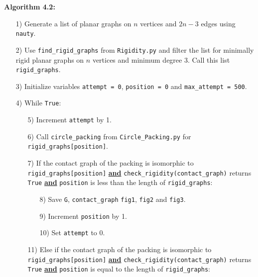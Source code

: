 \begin{flushleft}
\textbf{Algorithm 4.2:}
\begin{enumerate}
    \item[1)] Generate a list of planar graphs on $n$ vertices and $2n-3$ edges using \texttt{nauty}.
    \vspace{-3mm}
    \item[2)] Use \texttt{find\_rigid\_graphs} from \texttt{Rigidity.py} and filter the list for minimally rigid planar graphs on $n$ vertices and minimum degree 3. Call this list \texttt{rigid\_graphs}.
    \vspace{-3mm}
    \item[3)] Initialize variables \texttt{attempt = 0}, \texttt{position = 0} and \texttt{max\_attempt = 500}.
    \vspace{-3mm}
    \item[4)] While \texttt{True}:
    \vspace{-3mm}
    \begin{enumerate}
        \item[5)] Increment \texttt{attempt} by 1.
        \vspace{-1mm}
        \item[6)] Call \texttt{circle\_packing} from \texttt{Circle\_Packing.py} for \texttt{rigid\_graphs[position]}.
        \vspace{-1mm}
        \item[7)] If the contact graph of the packing is isomorphic to \texttt{rigid\_graphs[position]} \textbf{\underline{and}} \texttt{check\_rigidity(contact\_graph)} returns \texttt{True} \textbf{\underline{and}} \texttt{position} is less than the length of \texttt{rigid\_graphs}:
        \begin{enumerate}
            \item[8)] Save \texttt{G}, \texttt{contact\_graph} \texttt{fig1}, \texttt{fig2} and \texttt{fig3}.
            \vspace{-1mm}
            \item[9)] Increment \texttt{position} by 1.
            \vspace{-1mm}
            \item[10)] Set \texttt{attempt} to 0.
        \end{enumerate}
        \vspace{-1mm}
        \item[11)] Else if the contact graph of the packing is isomorphic to \texttt{rigid\_graphs[position]} \textbf{\underline{and}} \texttt{check\_rigidity(contact\_graph)} returns \texttt{True} \textbf{\underline{and}} \texttt{position} is equal to the length of \texttt{rigid\_graphs}:

\end{enumerate}
\end{enumerate}
\end{flushleft}
